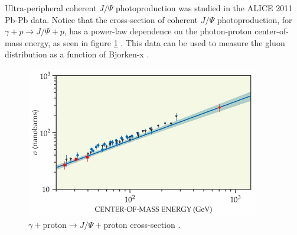 Ultra-peripheral coherent $J/\Psi$ photoproduction was studied in the ALICE 2011 Pb-Pb data. Notice that the cross-section of coherent $J/\Psi$ photoproduction, for $\gamma+p\rightarrow J/\Psi+p$, has a power-law dependence on the photon-proton center-of-mass energy, as seen in figure \ref{fig:aliceData1} \cite{Klein:2017nqo}. This data can be used to measure the gluon distribution as a function of Bjorken-x \cite{pQCD2011.08}. 
\begin{figure}[h!]
\begin{centering}
\includegraphics[width=4in]{Chapter2/importfigs/aliceData1.jpeg}
\par\end{centering}
\caption{$\gamma +$proton$\rightarrow J/\Psi +$proton cross-section \cite{Klein:2017nqo}. \label{fig:aliceData1}}
\end{figure}

